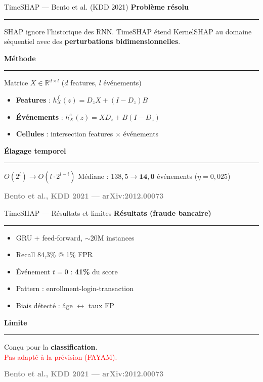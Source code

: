 \documentclass[10pt]{beamer}
\newcommand{\source}[1]{\vspace{6pt}\hfill{\textcolor{gray}{\textbf{\tiny #1}}}}
\begin{document}

\begin{frame}{TimeSHAP --- Bento et al. (KDD 2021)}
	\textbf{Problème résolu}
	\rule{\linewidth}{0.5pt}
	
	SHAP ignore l'historique des RNN. TimeSHAP étend KernelSHAP
	au domaine séquentiel avec des \textbf{perturbations bidimensionnelles}.
	
	\vspace{8pt}
	
	\textbf{Méthode}
	\rule{\linewidth}{0.5pt}
	
	Matrice $X \in \mathbb{R}^{d \times l}$ ($d$ features, $l$ événements)
	\begin{itemize}
		\item \textbf{Features} : $h_X^f(z) = D_z X + (I-D_z)B$
		\item \textbf{Événements} : $h_X^e(z) = XD_z + B(I-D_z)$
		\item \textbf{Cellules} : intersection features $\times$ événements
	\end{itemize}
	
	\vspace{8pt}
	
	\textbf{Élagage temporel}
	\rule{\linewidth}{0.5pt}
	
	$O(2^l) \to O(l \cdot 2^{l-i})$ \quad
	Médiane : $138{,}5 \to \mathbf{14{,}0}$ événements ($\eta=0{,}025$)
	
	\vspace{6pt}
	\source{Bento et al., KDD 2021 --- arXiv:2012.00073}
\end{frame}

\begin{frame}{TimeSHAP --- Résultats et limites}
	\textbf{Résultats (fraude bancaire)}
	\rule{\linewidth}{0.5pt}
	\vspace{2pt}
	
	\begin{itemize}
		\item GRU + feed-forward, $\sim$20M instances
		\item Recall 84,3\% @ 1\% FPR
		\item Événement $t=0$ : \textbf{41\%} du score
		\item Pattern : enrollment-login-transaction
		\item Biais détecté : âge $\leftrightarrow$ taux FP
	\end{itemize}
	
	\vspace{8pt}
	
	\textbf{Limite}
	\rule{\linewidth}{0.5pt}
	\vspace{2pt}
	
	Conçu pour la \textbf{classification}. \\
	\textcolor{red}{Pas adapté à la prévision (FAYAM).}
	
	\vspace{6pt}
	\source{Bento et al., KDD 2021 --- arXiv:2012.00073}
\end{frame}
\end{document}
